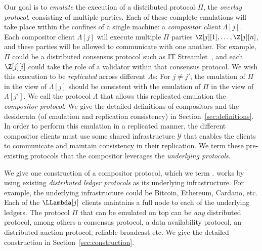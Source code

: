 Our goal is to \emph{emulate} the execution of a distributed protocol $\Pi$,
the \emph{overlay protocol},
consisting of multiple parties. Each of these complete emulations will take place
within the confines of a single machine: a \emph{compositor client} $\Lambda[j]$.
Each compositor client $\Lambda[j]$ will execute multiple $\Pi$ parties
$\Z[j][1], \ldots, \Z[j][n]$, and these parties will be allowed to communicate
with one another. For example, $\Pi$ could be a distributed consensus protocol such as
IT Streamlet~\cite{it-streamlet}, and each $\Z[j][i]$ could take the role of a
validator within that consensus protocol. We wish this execution to be \emph{replicated}
across different $\Lambda$s: For $j \neq j'$, the emulation of $\Pi$ in the view of $\Lambda[j]$
should be consistent with the emulation of $\Pi$ in the view of $\Lambda[j']$.
We call the protocol $\Lambda$ that allows this replicated emulation the
\emph{compositor protocol}. We give the detailed definitions of compositors
and the desiderata (of emulation and replication consistency) in Section~\ref{sec:definitions}.
In order to perform this emulation in a replicated manner, the different compositor
clients must use some shared infrastructure $\mathcal{Y}$ that enables the clients
to communicate and maintain consistency in their replication. We term these pre-existing
protocols that the compositor leverages the \emph{underlying protocols}.

We give one construction of a compositor protocol, which we term \emph{\rollerblade}.
\rollerblade works by using existing \emph{distributed ledger protocols} as its underlying infrastructure.
For example, the underlying infrastructure could be Bitcoin, Ethereum, Cardano, etc.
Each of the $\LLambda[j]$ clients maintains a full node to each of the underlying ledgers.
The protocol $\Pi$ that can be emulated on top can be \emph{any} distributed protocol,
among others a consensus protocol, a data availability protocol, an distributed
auction protocol, reliable broadcast etc. We give the detailed \rollerblade construction
in Section~\ref{sec:construction}.


